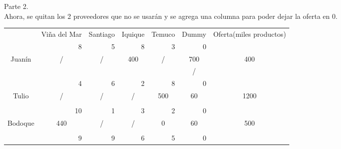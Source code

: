 \documentclass[12pt,letterpaper]{article}
\begin{document}
Parte 2. \\
Ahora, se quitan los 2 proveedores que no se usarán y se agrega una columna para poder dejar la oferta en 0.
\begin{center}
\begin{tabular}{ccc|ccc|ccc|ccc|ccc|ccc|ccc}
\multicolumn{3}{c|}{} & \multicolumn{3}{c}{Viña del Mar} & \multicolumn{3}{c}{Santiago} & \multicolumn{3}{c}{Iquique} & \multicolumn{3}{c|}{Temuco} & \multicolumn{3}{c|}{Dummy} & \multicolumn{3}{c}{Oferta(miles productos)}\\
\cline{1-15}
\multicolumn{3}{c|}{} & \multicolumn{3}{r|}{8} & \multicolumn{3}{r|}{5} & \multicolumn{3}{r|}{8} & \multicolumn{3}{r|}{3} & \multicolumn{3}{r|}{0}\\
\multicolumn{3}{c|}{Juanín} & \multicolumn{3}{c|}{/} & \multicolumn{3}{c|}{/} & \multicolumn{3}{c|}{400} & \multicolumn{3}{c|}{/} & \multicolumn{3}{c|}{700} & \multicolumn{3}{c}{400}\\
\multicolumn{3}{c|}{} & \multicolumn{3}{c|}{} & \multicolumn{3}{c|}{} & \multicolumn{3}{c|}{} & \multicolumn{3}{c|}{} & \multicolumn{3}{c|}{/}\\
\cline{1-15}
\multicolumn{3}{c|}{} & \multicolumn{3}{r|}{4} & \multicolumn{3}{r|}{6} & \multicolumn{3}{r|}{2} & \multicolumn{3}{r|}{8} & \multicolumn{3}{r|}{0}\\
\multicolumn{3}{c|}{Tulio} & \multicolumn{3}{c|}{/} & \multicolumn{3}{c|}{/} & \multicolumn{3}{c|}{/} & \multicolumn{3}{c|}{500} & \multicolumn{3}{c|}{60} & \multicolumn{3}{c}{1200}\\
\multicolumn{3}{c|}{} & \multicolumn{3}{c|}{} & \multicolumn{3}{c|}{} & \multicolumn{3}{c|}{} & \multicolumn{3}{c|}{} & \multicolumn{3}{c|}{}\\
\cline{1-15}
\multicolumn{3}{c|}{} & \multicolumn{3}{r|}{10} & \multicolumn{3}{r|}{1} & \multicolumn{3}{r|}{3} & \multicolumn{3}{r|}{2} & \multicolumn{3}{r|}{0}\\
\multicolumn{3}{c|}{Bodoque} & \multicolumn{3}{c|}{440} & \multicolumn{3}{c|}{/} & \multicolumn{3}{c|}{/} & \multicolumn{3}{c|}{0} & \multicolumn{3}{c|}{60}& \multicolumn{3}{c}{500}\\
\multicolumn{3}{c|}{} & \multicolumn{3}{c|}{} & \multicolumn{3}{c|}{} & \multicolumn{3}{c|}{} & \multicolumn{3}{c|}{} & \multicolumn{3}{c|}{}\\
\cline{1-15}
\multicolumn{3}{c|}{} & \multicolumn{3}{r|}{9} & \multicolumn{3}{r|}{9} & \multicolumn{3}{r|}{6} & \multicolumn{3}{r|}{5} & \multicolumn{3}{r|}{0} \\

\end{tabular}
\end{center}
\end{document}
